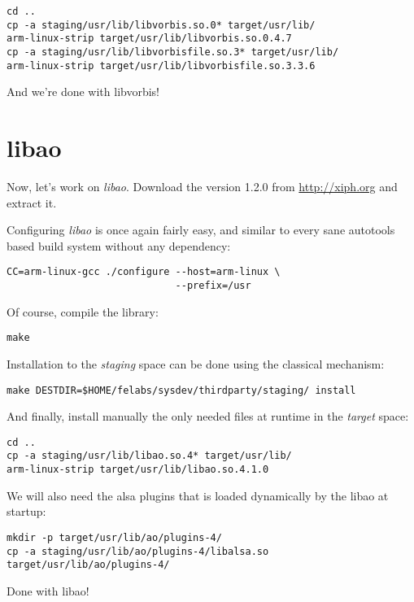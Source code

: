 \begin{verbatim}
cd ..
cp -a staging/usr/lib/libvorbis.so.0* target/usr/lib/
arm-linux-strip target/usr/lib/libvorbis.so.0.4.7
cp -a staging/usr/lib/libvorbisfile.so.3* target/usr/lib/
arm-linux-strip target/usr/lib/libvorbisfile.so.3.3.6
\end{verbatim}

And we're done with libvorbis!

\section{libao}

Now, let's work on {\em libao}. Download the version 1.2.0 from
\url{http://xiph.org} and extract it.

Configuring {\em libao} is once again fairly easy, and similar to
every sane autotools based build system without any dependency:

\begin{verbatim}
CC=arm-linux-gcc ./configure --host=arm-linux \
                             --prefix=/usr
\end{verbatim}

Of course, compile the library:

\begin{verbatim}
make
\end{verbatim}

Installation to the {\em staging} space can be done using the
classical  mechanism:

\begin{verbatim}
make DESTDIR=$HOME/felabs/sysdev/thirdparty/staging/ install
\end{verbatim}

And finally, install manually the only needed files at runtime in the
{\em target} space:

\begin{verbatim}
cd ..
cp -a staging/usr/lib/libao.so.4* target/usr/lib/
arm-linux-strip target/usr/lib/libao.so.4.1.0
\end{verbatim}

We will also need the alsa plugins that is loaded dynamically by the
libao at startup:
\begin{verbatim}
mkdir -p target/usr/lib/ao/plugins-4/
cp -a staging/usr/lib/ao/plugins-4/libalsa.so target/usr/lib/ao/plugins-4/
\end{verbatim}

Done with libao!

